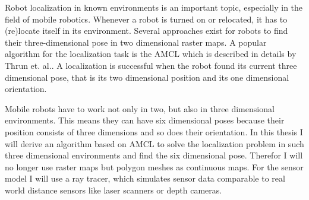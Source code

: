 \documentclass[Thesis.tex]{subfiles}
\begin{document}
Robot localization in known environments is an important topic, especially in the field of mobile robotics. Whenever a robot is turned on or relocated, it has to (re)locate itself in its environment. Several approaches exist for robots to find their three-dimensional pose in two dimensional raster maps. A popular algorithm for the localization task is the \gls{AMCL} which is described in details by Thrun et. al.\cite{ThrunBurgardFox:2005}. A localization is successful when the robot found its current three dimensional pose, that is its two dimensional position and its one dimensional orientation.

Mobile robots have to work not only in two, but also in three dimensional environments. This means they can have six dimensional poses because their position consists of three dimensions and so does their orientation. In this thesis I will derive an algorithm based on \gls{AMCL} to solve the localization problem in such three dimensional environments and find the six dimensional pose. Therefor I will no longer use raster maps but polygon meshes as continuous maps. For the sensor model I will use a ray tracer, which simulates sensor data comparable to real world distance sensors like laser scanners or depth cameras.
\end{document}

